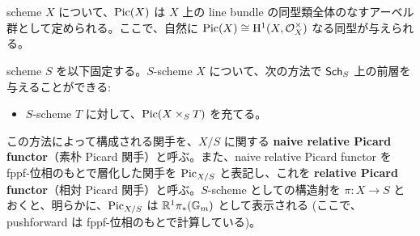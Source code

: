 scheme $X$ について、$\mathrm{Pic}(X)$ は $X$ 上の line bundle の同型類全体のなすアーベル群として定められる。ここで、自然に $\mathrm{Pic}(X) \cong \mathrm{H}^1(X, \mathcal{O}_X^\times)$ なる同型が与えられる。

scheme $S$ を以下固定する。$S$-scheme $X$ について、次の方法で $\mathsf{Sch}_S$ 上の前層を与えることができる:
\begin{itemize}
  \item $S$-scheme $T$ に対して、$\mathrm{Pic}(X \times_S T)$ を充てる。
\end{itemize}

この方法によって構成される関手を、$X / S$ に関する \textbf{naive relative Picard functor}（素朴 Picard 関手）と呼ぶ。また、naive relative Picard functor を fppf-位相のもとで層化した関手を $\mathrm{Pic}_{X / S}$ と表記し、これを \textbf{relative Picard functor}（相対 Picard 関手）と呼ぶ。$S$-scheme としての構造射を $\pi \colon X \to S$ とおくと、明らかに、$\mathrm{Pic}_{X / S}$ は $\mathbb{R}^1\pi_*(\mathbb{G}_m)$ として表示される (ここで、pushforward は fppf-位相のもとで計算している)。

\begin{lem}
  
\end{lem}